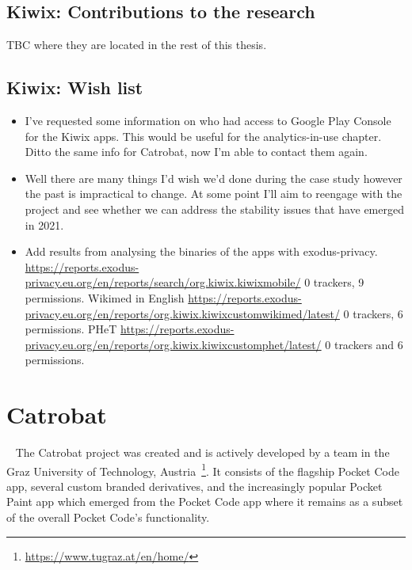 \subsection{Kiwix: Contributions to the research}
TBC where they are located in the rest of this thesis.

\subsection*{Kiwix: Wish list}
{\small
\begin{itemize}
    \itemsep0em
    \item I've requested some information on who had access to Google Play Console for the Kiwix apps. This would be useful for the analytics-in-use chapter. Ditto the same info for Catrobat, now I'm able to contact them again.
    \item Well there are many things I'd wish we'd done during the case study however the past is impractical to change. At some point I'll aim to reengage with the project and see whether we can address the stability issues that have emerged in 2021.
    \item Add results from analysing the binaries of the apps with exodus-privacy. \url{https://reports.exodus-privacy.eu.org/en/reports/search/org.kiwix.kiwixmobile/} 0 trackers, 9 permissions. Wikimed in English \url{https://reports.exodus-privacy.eu.org/en/reports/org.kiwix.kiwixcustomwikimed/latest/} 0 trackers, 6 permissions. PHeT \url{https://reports.exodus-privacy.eu.org/en/reports/org.kiwix.kiwixcustomphet/latest/} 0 trackers and 6 permissions.
\end{itemize}
}

\clearpage


\section{Catrobat}~\label{case-study-overview-catrobat}
The Catrobat project was created and is actively developed by a team in the Graz University of Technology, Austria~\footnote{\url{https://www.tugraz.at/en/home/}}. It consists of the flagship Pocket Code app, several custom branded derivatives, and the increasingly popular Pocket Paint app which emerged from the Pocket Code app where it remains as a subset of the overall Pocket Code's functionality. 

